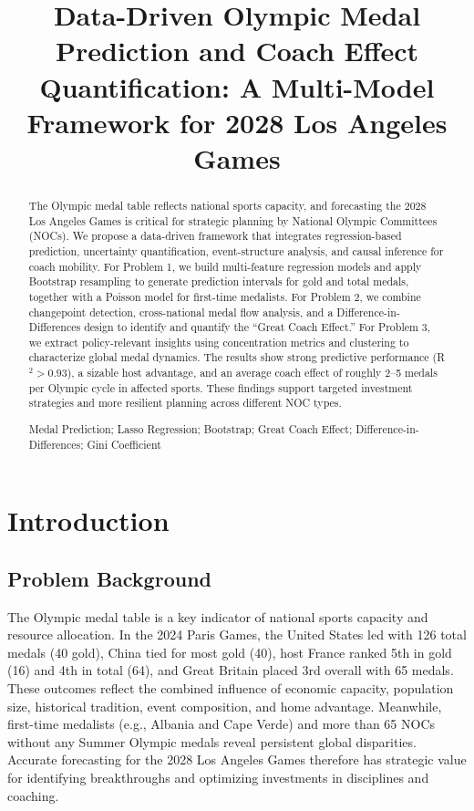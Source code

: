 \documentclass{mcmthesis}
\title{Data-Driven Olympic Medal Prediction and Coach Effect Quantification: A Multi-Model Framework for 2028 Los Angeles Games}
\begin{document}
\begin{abstract}
The Olympic medal table reflects national sports capacity, and forecasting the 2028 Los Angeles Games is critical for strategic planning by National Olympic Committees (NOCs). We propose a data-driven framework that integrates regression-based prediction, uncertainty quantification, event-structure analysis, and causal inference for coach mobility. For Problem 1, we build multi-feature regression models and apply Bootstrap resampling to generate prediction intervals for gold and total medals, together with a Poisson model for first-time medalists. For Problem 2, we combine changepoint detection, cross-national medal flow analysis, and a Difference-in-Differences design to identify and quantify the ``Great Coach Effect.'' For Problem 3, we extract policy-relevant insights using concentration metrics and clustering to characterize global medal dynamics. The results show strong predictive performance (R$^2>0.93$), a sizable host advantage, and an average coach effect of roughly 2--5 medals per Olympic cycle in affected sports. These findings support targeted investment strategies and more resilient planning across different NOC types.

\begin{keywords}
Medal Prediction; Lasso Regression; Bootstrap; Great Coach Effect; Difference-in-Differences; Gini Coefficient
\end{keywords}
\end{abstract}
\maketitle
\tableofcontents
\newpage

\section{Introduction}
\subsection{Problem Background}
The Olympic medal table is a key indicator of national sports capacity and resource allocation. In the 2024 Paris Games, the United States led with 126 total medals (40 gold), China tied for most gold (40), host France ranked 5th in gold (16) and 4th in total (64), and Great Britain placed 3rd overall with 65 medals. These outcomes reflect the combined influence of economic capacity, population size, historical tradition, event composition, and home advantage. Meanwhile, first-time medalists (e.g., Albania and Cape Verde) and more than 65 NOCs without any Summer Olympic medals reveal persistent global disparities. Accurate forecasting for the 2028 Los Angeles Games therefore has strategic value for identifying breakthroughs and optimizing investments in disciplines and coaching.
\end{document}
